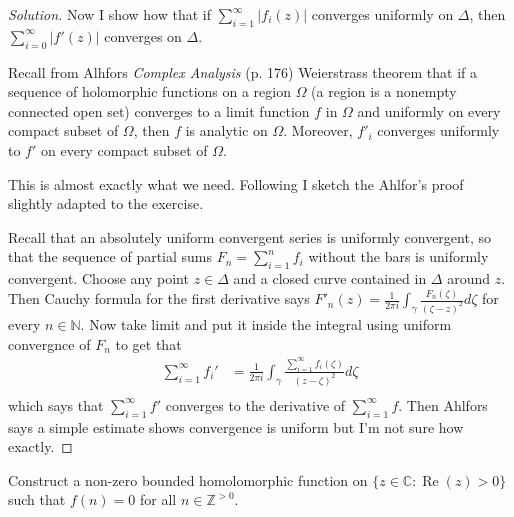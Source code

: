 \begin{proof}[Solution]
Now I show how that if $\sum_{i=1}^{\infty} |f_{i}(z)|$ converges uniformly on $\Delta$, then$\sum_{i=0}^{\infty}|f'(z)|$ converges on $\Delta$.

	Recall from Alhfors \textit{Complex Analysis} (p. 176) Weierstrass theorem that if a sequence of holomorphic functions on a region $\Omega$ (a region is a nonempty connected open set) converges to a limit function $f$ in $\Omega$ and uniformly on every compact subset of $\Omega$, then  $f$ is analytic on $\Omega$. Moreover, $f'_{i}$ converges uniformly to $f'$ on every compact subset of $\Omega$.

	This is almost exactly what we need. Following I sketch the Ahlfor's proof slightly adapted to the exercise.


	Recall that an absolutely uniform convergent series is uniformly convergent, so that the sequence of partial sums $F_n=\sum_{i=1}^{n} f_i$ without the bars is uniformly convergent. Choose any point $z\in \Delta$ and a closed curve contained in $\Delta$ around $z$. Then Cauchy formula for the first derivative says $F'_{n}(z)=\frac{1}{2\pi i}\int_{\gamma}\frac{F_n(\zeta)}{(\zeta-z)^{2}}d\zeta$ for every $n \in \mathbb{N}$.
	Now take limit and put it inside the integral using uniform convergnce of $F_n$ to get that
	\begin{align*}
	\sum_{i=1}^{\infty} f_i' &=\frac{1}{2\pi i}\int_{\gamma}\frac{\sum_{i=1}^{\infty} f_i(\zeta)}{(z-\zeta)^{2}}d\zeta\\
\end{align*}
which says that $\sum_{i=1}^{\infty} f'$ converges to the derivative of $\sum_{i=1}^{\infty} f$. Then Ahlfors says a simple estimate shows convergence is uniform but I'm not sure how exactly.
\end{proof}

\begin{manualexercise}{2.8}
	Construct a non-zero bounded homolomorphic function on $\{z\in \mathbb{C}:\operatorname{Re}(z)>0\} $ such that $f(n)=0$ for all $n \in \mathbb{Z}^{>0}$.
\end{manualexercise}

